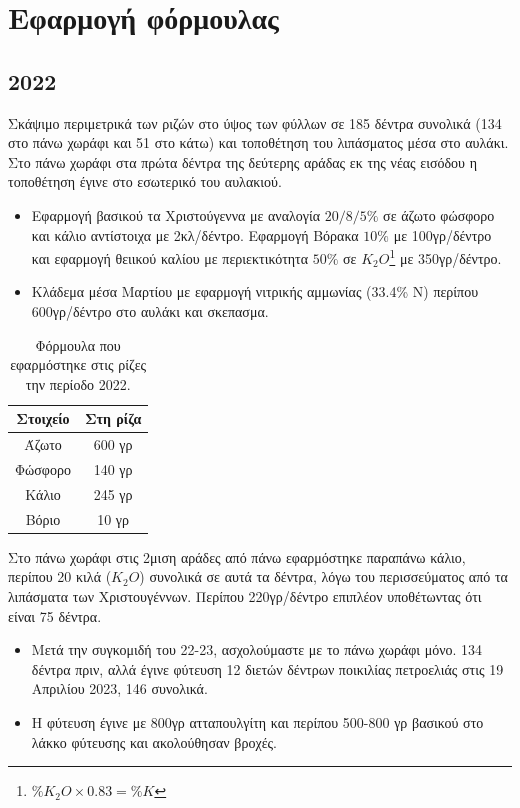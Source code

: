 \documentclass[12pt,a4paper]{article}
\begin{document}
\section{Εφαρμογή φόρμουλας}
\subsection{2022}
Σκάψιμο περιμετρικά των ριζών στο ύψος των φύλλων σε 185 δέντρα συνολικά (134 στο πάνω χωράφι και 51 στο κάτω) και τοποθέτηση του λιπάσματος μέσα στο αυλάκι. Στο πάνω χωράφι στα πρώτα δέντρα της δεύτερης αράδας εκ της νέας εισόδου η τοποθέτηση έγινε στο εσωτερικό του αυλακιού. 

\begin{itemize}
	\item Εφαρμογή βασικού τα Χριστούγεννα με αναλογία $20/8/5 \%$ σε άζωτο φώσφορο και κάλιο αντίστοιχα με 2κλ/δέντρο. Εφαρμογή Βόρακα $10\%$ με 100γρ/δέντρο και εφαρμογή θειικού καλίου με περιεκτικότητα $50\%$ σε $Κ_2Ο$\footnote{$\%K_2O\times 0.83=\%K$} με 350γρ/δέντρο. 
	\item Κλάδεμα μέσα Μαρτίου με εφαρμογή νιτρικής αμμωνίας (33.4\% Ν) περίπου 600γρ/δέντρο στο αυλάκι και σκεπασμα.  
	\end{itemize}

\begin{table}[ht!]
	\centering
	\begin{tabular}{|c|c|}
		\hline
		\textbf{Στοιχείο} & \textbf{Στη ρίζα}\\
		\hline 
		\hline
		Άζωτο &  600 γρ \\ 
		\hline 
		Φώσφορο &  140 γρ \\ 
		\hline 
		Κάλιο &  245 γρ \\ 
		\hline 
		Βόριο &  10 γρ\\ 
		\hline 
	\end{tabular} 
	\caption{Φόρμουλα που εφαρμόστηκε στις ρίζες την περίοδο 2022.}\label{tab:formula}
\end{table}
Στο πάνω χωράφι στις 2μιση αράδες από πάνω εφαρμόστηκε παραπάνω κάλιο, περίπου 20 κιλά ($Κ_2Ο$) συνολικά σε αυτά τα δέντρα, λόγω του περισσεύματος από τα λιπάσματα των Χριστουγέννων. Περίπου 220γρ/δέντρο επιπλέον υποθέτωντας ότι είναι 75 δέντρα.


\begin{itemize}
	\item Μετά την συγκομιδή του 22-23, ασχολούμαστε με το πάνω χωράφι μόνο. 134 δέντρα πριν, αλλά έγινε φύτευση 12 διετών δέντρων ποικιλίας πετροελιάς στις 19 Απριλίου 2023, 146 συνολικά.
	\item Η φύτευση έγινε με 800γρ ατταπουλγίτη και περίπου 500-800 γρ βασικού στο λάκκο φύτευσης και ακολούθησαν βροχές. 
\end{itemize}
\end{document}
